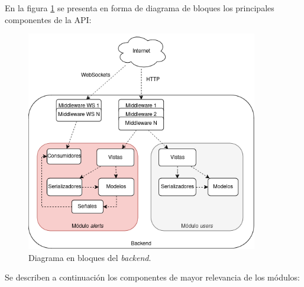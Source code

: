 En la figura \ref{backend:modulos} se presenta en forma de diagrama de bloques los principales componentes de la API:

\begin{figure}[H]
	\centering
	\includegraphics[width=0.9\textwidth]{./Figures/backend-componentes.png}
	\caption{Diagrama en bloques del \textit{backend}.}
	\label{backend:modulos}
\end{figure}

Se describen a continuación los componentes de mayor relevancia de los módulos:

